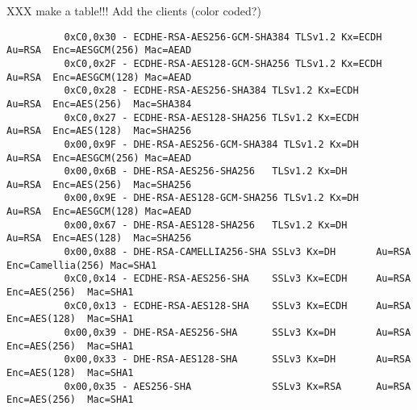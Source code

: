 XXX make a table!!! Add the clients (color coded?)
\begin{verbatim}
          0xC0,0x30 - ECDHE-RSA-AES256-GCM-SHA384 TLSv1.2 Kx=ECDH     Au=RSA  Enc=AESGCM(256) Mac=AEAD
          0xC0,0x2F - ECDHE-RSA-AES128-GCM-SHA256 TLSv1.2 Kx=ECDH     Au=RSA  Enc=AESGCM(128) Mac=AEAD
          0xC0,0x28 - ECDHE-RSA-AES256-SHA384 TLSv1.2 Kx=ECDH     Au=RSA  Enc=AES(256)  Mac=SHA384
          0xC0,0x27 - ECDHE-RSA-AES128-SHA256 TLSv1.2 Kx=ECDH     Au=RSA  Enc=AES(128)  Mac=SHA256
          0x00,0x9F - DHE-RSA-AES256-GCM-SHA384 TLSv1.2 Kx=DH       Au=RSA  Enc=AESGCM(256) Mac=AEAD
          0x00,0x6B - DHE-RSA-AES256-SHA256   TLSv1.2 Kx=DH       Au=RSA  Enc=AES(256)  Mac=SHA256
          0x00,0x9E - DHE-RSA-AES128-GCM-SHA256 TLSv1.2 Kx=DH       Au=RSA  Enc=AESGCM(128) Mac=AEAD
          0x00,0x67 - DHE-RSA-AES128-SHA256   TLSv1.2 Kx=DH       Au=RSA  Enc=AES(128)  Mac=SHA256
          0x00,0x88 - DHE-RSA-CAMELLIA256-SHA SSLv3 Kx=DH       Au=RSA  Enc=Camellia(256) Mac=SHA1
          0xC0,0x14 - ECDHE-RSA-AES256-SHA    SSLv3 Kx=ECDH     Au=RSA  Enc=AES(256)  Mac=SHA1
          0xC0,0x13 - ECDHE-RSA-AES128-SHA    SSLv3 Kx=ECDH     Au=RSA  Enc=AES(128)  Mac=SHA1
          0x00,0x39 - DHE-RSA-AES256-SHA      SSLv3 Kx=DH       Au=RSA  Enc=AES(256)  Mac=SHA1
          0x00,0x33 - DHE-RSA-AES128-SHA      SSLv3 Kx=DH       Au=RSA  Enc=AES(128)  Mac=SHA1
          0x00,0x35 - AES256-SHA              SSLv3 Kx=RSA      Au=RSA  Enc=AES(256)  Mac=SHA1
\end{verbatim}





